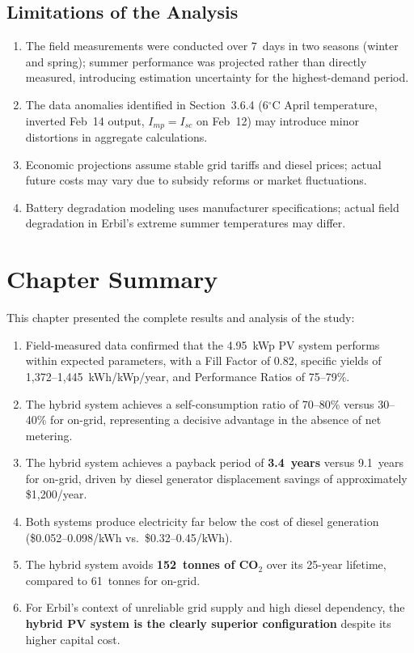 \subsection{Limitations of the Analysis}

\begin{enumerate}
    \item The field measurements were conducted over 7~days in two seasons (winter and spring); summer performance was projected rather than directly measured, introducing estimation uncertainty for the highest-demand period.
    \item The data anomalies identified in Section~3.6.4 (6$^{\circ}$C April temperature, inverted Feb~14 output, $I_{mp} = I_{sc}$ on Feb~12) may introduce minor distortions in aggregate calculations.
    \item Economic projections assume stable grid tariffs and diesel prices; actual future costs may vary due to subsidy reforms or market fluctuations.
    \item Battery degradation modeling uses manufacturer specifications; actual field degradation in Erbil's extreme summer temperatures may differ.
\end{enumerate}


\section{Chapter Summary}

This chapter presented the complete results and analysis of the study:

\begin{enumerate}
    \item Field-measured data confirmed that the 4.95~kWp PV system performs within expected parameters, with a Fill Factor of 0.82, specific yields of 1,372--1,445~kWh/kWp/year, and Performance Ratios of 75--79\%.
    \item The hybrid system achieves a self-consumption ratio of 70--80\% versus 30--40\% for on-grid, representing a decisive advantage in the absence of net metering.
    \item The hybrid system achieves a payback period of \textbf{3.4~years} versus 9.1~years for on-grid, driven by diesel generator displacement savings of approximately \$1,200/year.
    \item Both systems produce electricity far below the cost of diesel generation (\$0.052--0.098/kWh vs.\ \$0.32--0.45/kWh).
    \item The hybrid system avoids \textbf{152~tonnes of CO$_2$} over its 25-year lifetime, compared to 61~tonnes for on-grid.
    \item For Erbil's context of unreliable grid supply and high diesel dependency, the \textbf{hybrid PV system is the clearly superior configuration} despite its higher capital cost.
\end{enumerate}
